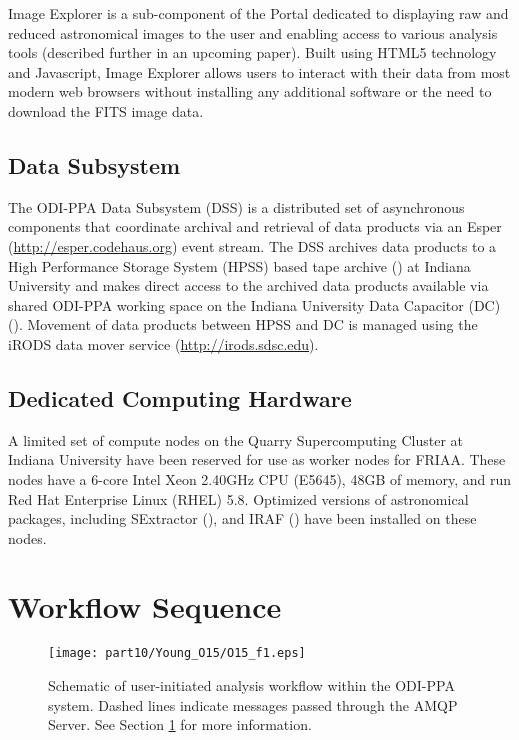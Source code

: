 Image Explorer is a sub-component of the Portal dedicated to displaying raw and reduced astronomical images to the user and enabling access to various analysis tools (described further in an upcoming paper).   Built using HTML5 technology and Javascript, Image Explorer allows users to interact with their data from most modern web browsers without installing any additional software or the need to download the FITS image data.

\subsection{Data Subsystem}
\label{section:dss}

The ODI-PPA Data Subsystem (DSS) is a distributed set of asynchronous components that coordinate archival and retrieval of data products via an Esper (\url{http://esper.codehaus.org}) event stream. The DSS archives data products to a High Performance Storage System (HPSS) based tape archive (\cite{hpss}) at Indiana University and makes direct access to the archived data products available via shared ODI-PPA working space on the Indiana University Data Capacitor (DC) (\cite{dataCapacitor}).  Movement of data products between HPSS and DC is managed using the iRODS data mover service (\url{http://irods.sdsc.edu}).  

\subsection{Dedicated Computing Hardware}
\label{section:wn}

A limited set of compute nodes on the Quarry Supercomputing Cluster at Indiana University have been reserved for use as worker nodes for %
FRIAA.  These nodes have a 6-core Intel Xeon 2.40GHz CPU (E5645), 48GB of memory, and run Red Hat Enterprise Linux (RHEL) 5.8.  Optimized versions of astronomical packages, including SExtractor (\cite{sextractor}), and IRAF (\cite{iraf}) have been installed on these nodes. 

\section{Workflow Sequence}
\label{section:workflow}

\begin{figure}
\texttt{[image: part10/Young\_O15/O15\_f1.eps]}
\caption{Schematic of user-initiated analysis workflow within the ODI-PPA system.  Dashed lines indicate messages passed through the AMQP Server. See Section \ref{section:workflow} for more information.}
\label{fig:workflow}
\end{figure}

